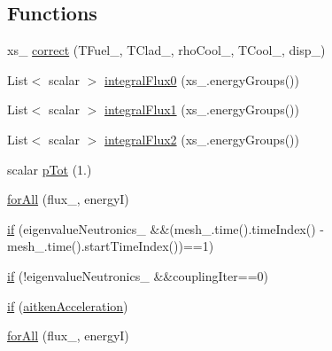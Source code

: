 \subsection*{Functions}
\begin{DoxyCompactItemize}
\item 
xs\+\_\+ \hyperlink{solveNeutronicsSP3_8H_a12046a30b04bbfb1f05948a712e65123}{correct} (T\+Fuel\+\_\+, T\+Clad\+\_\+, rho\+Cool\+\_\+, T\+Cool\+\_\+, disp\+\_\+)
\item 
List$<$ scalar $>$ \hyperlink{solveNeutronicsSP3_8H_a878e0d7c7ddf3831a14074bb63d6a839}{integral\+Flux0} (xs\+\_\+.\+energy\+Groups())
\item 
List$<$ scalar $>$ \hyperlink{solveNeutronicsSP3_8H_a60f4c66a6d2038597352e756b561df82}{integral\+Flux1} (xs\+\_\+.\+energy\+Groups())
\item 
List$<$ scalar $>$ \hyperlink{solveNeutronicsSP3_8H_af44826903f6e2526873bc21a21bd8436}{integral\+Flux2} (xs\+\_\+.\+energy\+Groups())
\item 
scalar \hyperlink{solveNeutronicsSP3_8H_ae5591870910ae075926ced03a5923185}{p\+Tot} (1.)
\item 
\hyperlink{solveNeutronicsSP3_8H_a72f1858746fb864f8d04fe468bbd8465}{for\+All} (flux\+\_\+, energyI)
\item 
\hyperlink{solveNeutronicsSP3_8H_a8ccbcf3a22f674106ef4daebb7d1eb21}{if} (eigenvalue\+Neutronics\+\_\+ \&\&(mesh\+\_\+.\+time().time\+Index() -\/mesh\+\_\+.\+time().start\+Time\+Index())==1)
\item 
\hyperlink{solveNeutronicsSP3_8H_aa45d1c9649b2f6055780946f5005174e}{if} (!eigenvalue\+Neutronics\+\_\+ \&\&coupling\+Iter==0)
\item 
\hyperlink{fluxEqSP3_8H_aed339a2869aa628e2e52d03349a3769c}{if} (\hyperlink{solveNeutronicsSP3_8H_a94a477396c84cabf64ee11e6cc47bc86}{aitken\+Acceleration})
\item 
\hyperlink{fluxEqSP3_8H_a72f1858746fb864f8d04fe468bbd8465}{for\+All} (flux\+\_\+, energyI)
\end{DoxyCompactItemize}
